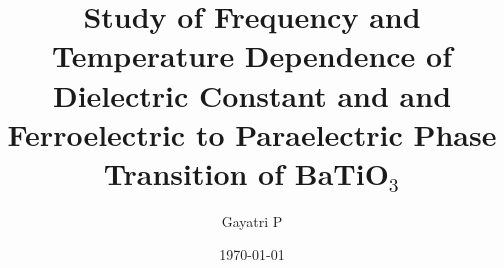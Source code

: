 \documentclass[reprint,amsmath,amssymb,aps, margin=1in]{revtex4-2}
\begin{document}
    \title{Study of Frequency and Temperature Dependence of Dielectric Constant and and Ferroelectric to Paraelectric Phase Transition of BaTiO$_3$}

    \author{Gayatri P}
    \date{\today}

    
    \maketitle

    
    
    

    
    \nocite{*}
\end{document}
